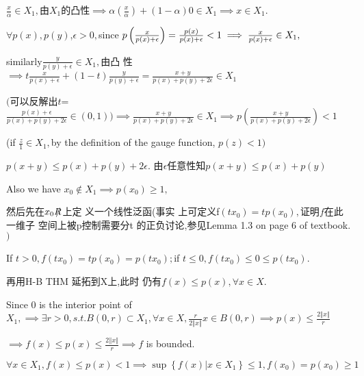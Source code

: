 \documentclass{ctexart}
\begin{document}
$\frac{x}{\alpha }\in X_{1},$由$X_{1}$的凸性$%
\implies \alpha \left( \frac{x}{\alpha }\right) +\left( 1-\alpha \right)
0\in X_{1}\implies x\in X_{1}.$

$\forall p\left( x\right) ,p\left( y\right) $,$\epsilon >0,$since $p\left( 
\frac{x}{p\left( x\right) +\epsilon }\right) =\frac{p\left( x\right) }{%
p\left( x\right) +\epsilon }<1\implies \frac{x}{p\left( x\right) +\epsilon }%
\in X_{1},$

similarly$\frac{y}{p\left( y\right) +\epsilon }\in X_{1},$由凸%
性$\implies t\frac{x}{p\left( x\right) +\epsilon }+\left( 1-t\right) 
\frac{y}{p\left( y\right) +\epsilon }=\frac{x+y}{p\left( x\right) +p\left(
y\right) +2\epsilon }\in X_{1}$

$($可以反解出$t$=$\frac{p\left( x\right)
+\epsilon }{p\left( x\right) +p\left( y\right) +2\epsilon }\in \left(
0,1\right) )\implies \frac{x+y}{p\left( x\right) +p\left( y\right)
+2\epsilon }\in X_{1}\implies p\left( \frac{x+y}{p\left( x\right) +p\left(
y\right) +2\epsilon }\right) <1$

(if $\frac{z}{1}\in X_{1},$by the definition of the gauge function, $p\left(
z\right) <1)$

$p\left( x+y\right) \leq p\left( x\right) +p\left( y\right) +2\epsilon .$%
由$\epsilon $任意性知$p\left( x+y\right) \leq
p\left( x\right) +p\left( y\right) $

Also we have $x_{0}\notin X_{1}\implies p\left( x_{0}\right) \geq 1,$

\bigskip 然后先在$x_{0}\NEG{R}$上定%
义一个线性泛函(事实%
上可定义f$\left( tx_{0}\right) =tp\left(
x_{0}\right) ,$证明$f$在此一维子%
空间上被p控制需要分t%
的正负讨论,参见Lemma 1.3 on page 6
of textbook.$)$

If $t>0,f\left( tx_{0}\right) =tp\left( x_{0}\right) =p\left( tx_{0}\right)
; $if $t\leq 0,f\left( tx_{0}\right) \leq 0\leq p\left( tx_{0}\right) .$

再用H-B THM 延拓到X上,此时%
仍有$f(x)\leq p\left( x\right) ,\forall x\in X$.

Since $0$ is the interior point of $X_{1},\implies \exists r>0,s.t.B\left(
0,r\right) \subset X_{1},\forall x\in X,\frac{r}{2\left\Vert x\right\Vert }%
x\in B\left( 0,r\right) \implies p\left( x\right) \leq \frac{2\left\Vert
x\right\Vert }{r}$

$\implies f\left( x\right) \leq p\left( x\right) \leq \frac{2\left\Vert
x\right\Vert }{r}\implies f$ is bounded.

\bigskip $\forall x\in X_{1},f\left( x\right) \leq p\left( x\right)
<1\implies \sup \left\{ f\left( x\right) |x\in X_{1}\right\} \leq 1,f\left(
x_{0}\right) =p\left( x_{0}\right) \geq 1$
\end{document}
